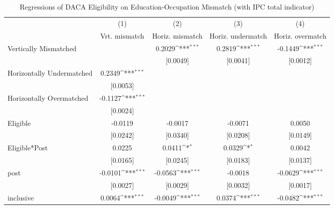 \begin{table}[htbp]\centering
\def\sym#1{\ifmmode^{#1}\else\(^{#1}\)\fi}
\caption{Regressions of DACA Eligibility on Education-Occupation Mismatch (with IPC total indicator)}
\begin{tabular}{l*{4}{c}}
\toprule
                    &\multicolumn{1}{c}{(1)}         &\multicolumn{1}{c}{(2)}         &\multicolumn{1}{c}{(3)}         &\multicolumn{1}{c}{(4)}         \\
                    &Vrt. mismatch         &Horiz. mismatch         &Horiz. undermatch         &Horiz. overmatch         \\
\midrule
Vertically Mismatched&                     &      0.2029\sym{***}&      0.2819\sym{***}&     -0.1449\sym{***}\\
                    &                     &    [0.0049]         &    [0.0041]         &    [0.0012]         \\
\addlinespace
Horizontally Undermatched&      0.2349\sym{***}&                     &                     &                     \\
                    &    [0.0053]         &                     &                     &                     \\
\addlinespace
Horizontally Overmatched&     -0.1127\sym{***}&                     &                     &                     \\
                    &    [0.0024]         &                     &                     &                     \\
\addlinespace
Eligible            &     -0.0119         &     -0.0017         &     -0.0071         &      0.0050         \\
                    &    [0.0242]         &    [0.0340]         &    [0.0208]         &    [0.0149]         \\
\addlinespace
Eligible*Post       &      0.0225         &      0.0411\sym{*}  &      0.0329\sym{*}  &      0.0042         \\
                    &    [0.0165]         &    [0.0245]         &    [0.0183]         &    [0.0137]         \\
\addlinespace
post                &     -0.0101\sym{***}&     -0.0563\sym{***}&     -0.0018         &     -0.0629\sym{***}\\
                    &    [0.0027]         &    [0.0029]         &    [0.0032]         &    [0.0017]         \\
\addlinespace
inclusive           &      0.0064\sym{***}&     -0.0049\sym{***}&      0.0374\sym{***}&     -0.0482\sym{***}\\

\end{tabular}
\end{table}
